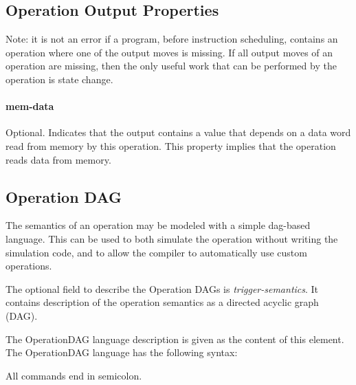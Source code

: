 \documentclass[twoside]{tceusermanual}
\begin{document}
\subsection{Operation Output Properties}
\label{ssec:opoutput-properties}

Note: it is not an error if a program, before instruction scheduling,
contains an operation where one of the output moves is missing. If all
output moves of an operation are missing, then the only useful work that can
be performed by the operation is state change.

\paragraph{mem-data}
Optional.  Indicates that the output contains a value that depends on a
data word read from memory by this operation.  This property implies that
the operation reads data from memory.

\subsection{Operation DAG}
\label{ssec:operation-dag}

The semantics of an operation may be modeled with a simple dag-based language.
This can be used to both simulate the operation without writing the 
simulation code, and to allow the compiler to automatically use custom
operations.

The optional field to describe the Operation DAGs is 
\textit{trigger-semantics}. It contains description of the operation 
semantics as a directed acyclic graph (DAG). 

The OperationDAG language description is given as the content of this element.
The OperationDAG language has the following syntax:

All commands end in semicolon.
\end{document}
